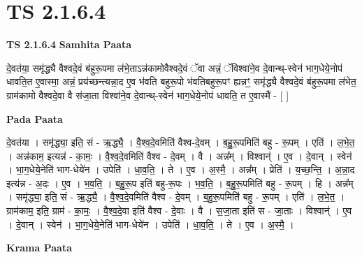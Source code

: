 \documentclass[17pt]{extarticle}
\begin{document}
\section{ TS 2.1.6.4 }

\textbf{TS 2.1.6.4 } \newline
\textbf{Samhita Paata} \newline

दे॒वत॑या॒ समृ॑द्ध्यै वैश्वदे॒वं ब॑हुरू॒पमा ल॑भे॒ताऽन्न॑कामोवैश्वदे॒वं ॅवा अन्नं॒ ॅविश्वा॑ने॒व दे॒वान्थ्-स्वेन॑ भाग॒धेये॒नोप॑ धावति॒त ए॒वास्मा॒ अन्नं॒ प्रय॑च्छन्त्यन्ना॒द ए॒व भ॑वति बहुरू॒पो भ॑वतिबहुरू॒पꣳ ह्यन्नꣳ॒॒ समृ॑द्ध्यै वैश्वदे॒वं ब॑हुरू॒पमा ल॑भेत॒ ग्राम॑कामो वैश्वदे॒वा वै स॑जा॒ता विश्वा॑ने॒व दे॒वान्थ्-स्वेन॑ भाग॒धेये॒नोप॑ धावति॒ त ए॒वास्मै॑ - [  ] \newline

\textbf{Pada Paata} \newline

दे॒वत॑या । समृ॑द्ध्या॒ इति॒ सं - ऋ॒द्ध्यै॒ । वै॒श्व॒दे॒वमिति॑ वैश्व-दे॒वम् । ब॒हु॒रू॒पमिति॑ बहु - रू॒पम् । एति॑ । ल॒भे॒त॒ । अन्न॑काम॒ इत्यन्न॑ - का॒मः॒ । वै॒श्व॒दे॒वमिति॑ वैश्व - दे॒वम् । वै । अन्न᳚म् । विश्वान्॑ । ए॒व । दे॒वान् । स्वेन॑ । भा॒ग॒धेये॒नेति॑ भाग-धेये॑न । उपेति॑ । धा॒व॒ति॒ । ते । ए॒व । अ॒स्मै॒ । अन्न᳚म् । प्रेति॑ । य॒च्छ॒न्ति॒ । अ॒न्ना॒द इत्य॑न्न - अ॒दः । ए॒व । भ॒व॒ति॒ । ब॒हु॒रू॒प इति॑ बहु-रू॒पः । भ॒व॒ति॒ । ब॒हु॒रू॒पमिति॑ बहु - रू॒पम् । हि । अन्न᳚म् । समृ॑द्ध्या॒ इति॒ सं - ऋ॒द्ध्यै॒ । वै॒श्व॒दे॒वमिति॑ वैश्व - दे॒वम् । ब॒हु॒रू॒पमिति॑ बहु - रू॒पम् । एति॑ । ल॒भे॒त॒ । ग्राम॑काम॒ इति॒ ग्राम॑ - का॒मः॒ । वै॒श्व॒दे॒वा इति॑ वैश्व - दे॒वाः । वै । स॒जा॒ता इति॑ स - जा॒ताः । विश्वान्॑ । ए॒व । दे॒वान् । स्वेन॑ । भा॒ग॒धेये॒नेति॑ भाग-धेये॑न । उपेति॑ । धा॒व॒ति॒ । ते । ए॒व । अ॒स्मै॒ ।  \newline


\textbf{Krama Paata} \newline
\end{document}
